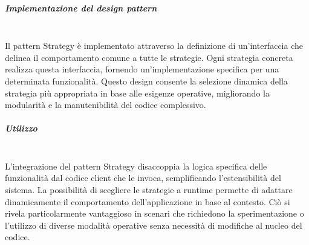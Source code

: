 \documentclass[10pt]{article}
\newcommand{\mysubparagraph}[1]{\subparagraph{#1}\mbox{}\\}
\begin{document}
    \mysubparagraph{Implementazione del design pattern}
    Il pattern Strategy è implementato attraverso la definizione di un'interfaccia che delinea il comportamento comune a tutte le strategie. Ogni strategia concreta realizza questa interfaccia, fornendo un'implementazione specifica per una determinata funzionalità. Questo design consente la selezione dinamica della strategia più appropriata in base alle esigenze operative, migliorando la modularità e la manutenibilità del codice complessivo.

    \mysubparagraph{Utilizzo}
    L'integrazione del pattern Strategy disaccoppia la logica specifica delle funzionalità dal codice client che le invoca, semplificando l'estensibilità del sistema. La possibilità di scegliere le strategie a runtime permette di adattare dinamicamente il comportamento dell'applicazione in base al contesto. Ciò si rivela particolarmente vantaggioso in scenari che richiedono la sperimentazione o l'utilizzo di diverse modalità operative senza necessità di modifiche al nucleo del codice.
\end{document}

